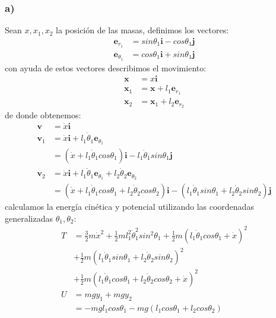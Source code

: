 \documentclass{article}
\begin{document}
\begin{tcolorbox}[breakable]
    \subsubsection*{a)}
    Sean $x,x_1,x_2$ la posición de las masas, definimos los vectores:
    \begin{align*}
        \bm{e}_{r_1} &= sin\theta_1\bm{i} - cos\theta_1\bm{j} \\
        \bm{e}_{\theta_1} &= cos\theta_1\bm{i} + sin\theta_1\bm{j} 
    \end{align*}
    con ayuda de estos vectores describimos el movimiento:
    \begin{align*}
        \bm{x} &= x\bm{i} \\
        \bm{x}_1 &= \bm{x} + l_1\bm{e}_{r_1} \\
        \bm{x}_2 &= \bm{x}_1 + l_2\bm{e}_{r_2} 
    \end{align*}
    de donde obtenemos:
    \begin{align*}
        \bm{v}
        &= \dot{x}\bm{i} \\
        \bm{v}_1 
        &= \dot{x}\bm{i} + l_1\dot{\theta}_1\bm{e}_{\theta_1} \\
        &= (\dot{x} + l_1\dot{\theta}_1cos\theta_1 )\bm{i} - l_1\dot{\theta}_1sin\theta_1 \bm{j} \\
        \bm{v}_2 
        &= \dot{x}\bm{i} + l_1\dot{\theta}_1\bm{e}_{\theta_1} + l_2\dot{\theta}_2\bm{e}_{\theta_2} \\
        &= (\dot{x} + l_1\dot{\theta}_1cos\theta_1 + l_2\dot{\theta}_2cos\theta_2)\bm{i} - (l_1\dot{\theta}_1sin\theta_1 + l_2\dot{\theta}_2sin\theta_2) \bm{j} 
    \end{align*}
    calculamos la energía cinética y potencial utilizando las coordenadas generalizadas $\theta_1,\theta_2$:
    \begin{align*}
        T 
        &= \frac{3}{2}m\dot{x}^2 + \frac{1}{2}ml_1^2\dot{\theta}_1^2sin^2\theta_1 + \frac{1}{2}m(l_1 \dot{\theta}_1 cos\theta_1 + \dot{x})^2 \\
        &+ \frac{1}{2}m(l_1\dot{\theta}_1 sin\theta_1 + l_2\dot{\theta}_2 sin\theta_2)^2 \\
        &+ \frac{1}{2}m(l_1\dot{\theta}_1cos\theta_1 + l_2\dot{\theta}_2 cos\theta_2 + \dot{x})^2 \\
        U
        &= mgy_1 + mgy_2 \\
        &= -mgl_1cos\theta_1 - mg(l_1cos\theta_1 + l_2cos\theta_2) \\

\end{align*}
\end{tcolorbox}
\end{document}
